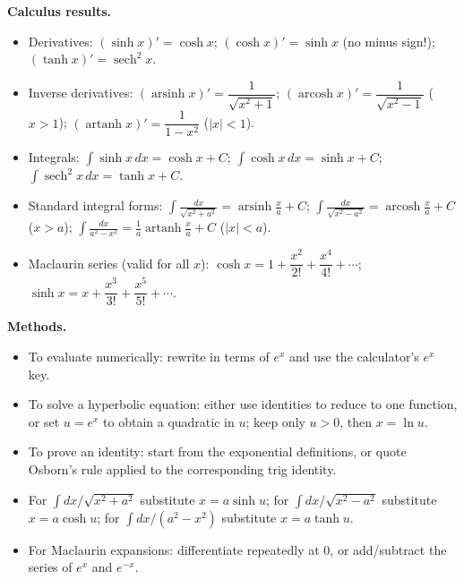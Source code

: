 \documentclass[11pt]{article}
\begin{document}
\begin{bilan}
\textbf{Calculus results.}
\begin{itemize}
\item Derivatives: $(\sinh x)'=\cosh x$; $(\cosh x)'=\sinh x$ (no minus sign!); $(\tanh x)'=\operatorname{sech}^{2}x$.
\item Inverse derivatives: $(\operatorname{arsinh} x)'=\dfrac{1}{\sqrt{x^{2}+1}}$; $(\operatorname{arcosh} x)'=\dfrac{1}{\sqrt{x^{2}-1}}$ ($x>1$); $(\operatorname{artanh} x)'=\dfrac{1}{1-x^{2}}$ ($|x|<1$).
\item Integrals: $\displaystyle\int\sinh x\,dx=\cosh x+C$; $\displaystyle\int\cosh x\,dx=\sinh x+C$; $\displaystyle\int\operatorname{sech}^{2}x\,dx=\tanh x+C$.
\item Standard integral forms:
$\displaystyle\int\frac{dx}{\sqrt{x^{2}+a^{2}}}=\operatorname{arsinh}\frac{x}{a}+C$;
$\displaystyle\int\frac{dx}{\sqrt{x^{2}-a^{2}}}=\operatorname{arcosh}\frac{x}{a}+C$ ($x>a$);
$\displaystyle\int\frac{dx}{a^{2}-x^{2}}=\frac{1}{a}\operatorname{artanh}\frac{x}{a}+C$ ($|x|<a$).
\item Maclaurin series (valid for all $x$):
$\cosh x=1+\dfrac{x^{2}}{2!}+\dfrac{x^{4}}{4!}+\cdots$; \quad
$\sinh x=x+\dfrac{x^{3}}{3!}+\dfrac{x^{5}}{5!}+\cdots$.
\end{itemize}

\textbf{Methods.}
\begin{itemize}
\item To evaluate numerically: rewrite in terms of $e^{x}$ and use the calculator's $e^{x}$ key.
\item To solve a hyperbolic equation: either use identities to reduce to one function, or set $u=e^{x}$ to obtain a quadratic in $u$; keep only $u>0$, then $x=\ln u$.
\item To prove an identity: start from the exponential definitions, or quote Osborn's rule applied to the corresponding trig identity.
\item For $\int dx/\sqrt{x^{2}+a^{2}}$ substitute $x=a\sinh u$; for $\int dx/\sqrt{x^{2}-a^{2}}$ substitute $x=a\cosh u$; for $\int dx/(a^{2}-x^{2})$ substitute $x=a\tanh u$.
\item For Maclaurin expansions: differentiate repeatedly at $0$, or add/subtract the series of $e^{x}$ and $e^{-x}$.
\end{itemize}


\end{bilan}
\end{document}
